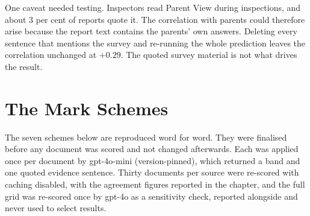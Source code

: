 One caveat needed testing. Inspectors read Parent View during inspections, and about 3 per cent
of reports quote it. The correlation with parents could therefore arise because the report text contains the parents' own answers. Deleting every sentence that mentions the survey and re-running the whole prediction
leaves the correlation unchanged at $+0.29$. The quoted survey material is not what drives the result.

\section{The Mark Schemes}
\label{sec:p1_app_rubrics}

The seven schemes below are reproduced word for word. They were finalised before any document was scored and not changed afterwards.
Each was applied once per document by gpt-4o-mini (version-pinned), which
returned a band and one quoted evidence sentence. Thirty documents per source were re-scored with caching disabled, with the agreement figures reported in the chapter, and the full grid was re-scored
once by gpt-4o as a sensitivity check, reported alongside and never used
to select results.


